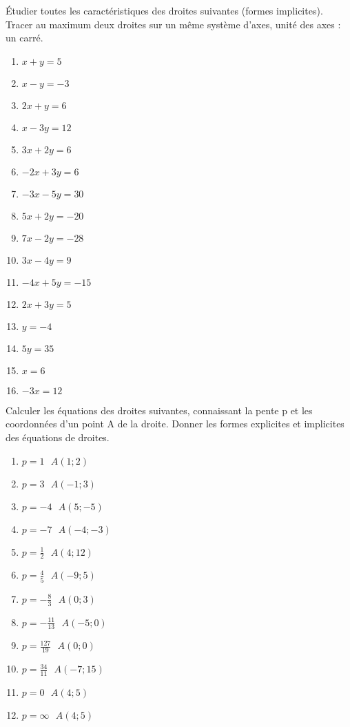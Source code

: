 \begin{exercice}
\'Etudier toutes les caractéristiques des droites suivantes (formes implicites).
	Tracer au maximum deux droites sur un même système d'axes, unité des axes : un carré.
\begin{multicols}{2}
\begin{enumerate}
\item $x+y=5$
\item $x-y=-3$
\item $2x+y=6$
\item $x-3y=12$
\item $3x+2y=6$
\item $-2x+3y=6$
\item $-3x-5y=30$
\item $5x+2y=-20$
\item $7x-2y=-28$
\item $3x-4y=9$
\item $-4x+5y=-15$
\item $2x+3y=5$
\item $y=-4$
\item $5y=35$
\item $x=6$
\item $-3x=12$
\end{enumerate}
\end{multicols}
\end{exercice}

\begin{exercice}
Calculer les équations des droites suivantes, connaissant la pente p et les coordonnées d'un point A de la droite. Donner les formes explicites et implicites des équations de droites.
\begin{multicols}{2}
\begin{enumerate}
\item $p=1\text{     }A(1;2)$
\item $p=3\text{     }A(-1;3)$
\item $p=-4\text{     }A(5;-5)$
\item $p=-7\text{     }A(-4;-3)$
\item $p=\frac{1}{2}\text{     }A(4;12)$
\item $p=\frac{4}{5}\text{     }A(-9;5)$
\item $p=-\frac{8}{3}\text{     }A(0;3)$
\item $p=-\frac{11}{13}\text{     }A(-5;0)$
\item $p=\frac{127}{19}\text{     }A(0;0)$
\item $p=\frac{34}{11}\text{     }A(-7;15)$
\item $p=0\text{     }A(4;5)$
\item $p=\infty \text{     }A(4;5)$
\end{enumerate}
\end{multicols}
\end{exercice}

